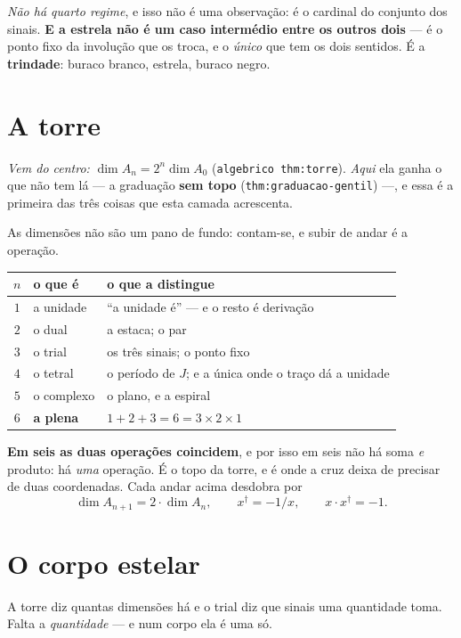 \documentclass[11pt,a4paper]{article}
\newcommand{\code}[1]{\texttt{\small #1}}
\newcommand{\dg}{^{\dagger}}
\begin{document}
\noindent \emph{Não há quarto regime}, e isso não é uma observação: é o cardinal do conjunto dos
sinais. \textbf{E a estrela não é um caso intermédio entre os outros dois} --- é o ponto fixo da
involução que os troca, e o \emph{único} que tem os dois sentidos. É a \textbf{trindade}: buraco
branco, estrela, buraco negro.

\section{A torre}\label{sec:torre}

\noindent\emph{Vem do centro:} $\dim A_n=2^n\dim A_0$ (\code{algebrico thm:torre}).
\emph{Aqui} ela ganha o que não tem lá --- a graduação \textbf{sem topo}
(\code{thm:graduacao-gentil}) ---, e essa é a primeira das três coisas que esta camada
acrescenta.

As dimensões não são um pano de fundo: contam-se, e subir de andar é a operação.

\begin{center}\small
\begin{tabular}{@{}cll@{}}
\toprule
$n$ & o que é & o que a distingue \\
\midrule
$1$ & a unidade & ``a unidade é'' --- e o resto é derivação \\
$2$ & o dual & a estaca; o par \\
$3$ & o trial & os três sinais; o ponto fixo \\
$4$ & o tetral & o período de $J$; e a única onde o traço dá a unidade \\
$5$ & o complexo & o plano, e a espiral \\
$6$ & \textbf{a plena} & $1+2+3=6=3\times2\times1$ \\
\bottomrule
\end{tabular}
\end{center}

\noindent \textbf{Em seis as duas operações coincidem}, e por isso em seis não há soma \emph{e}
produto: há \emph{uma} operação. É o topo da torre, e é onde a cruz deixa de precisar de duas
coordenadas. Cada andar acima desdobra por
\[
  \dim A_{n+1}=2\cdot\dim A_n, \qquad x\dg=-1/x, \qquad x\cdot x\dg=-1 .
\]

\section{O corpo estelar}\label{sec:corpo}

A torre diz quantas dimensões há e o trial diz que sinais uma quantidade toma. Falta a
\emph{quantidade} --- e num corpo ela é uma só.
\end{document}
